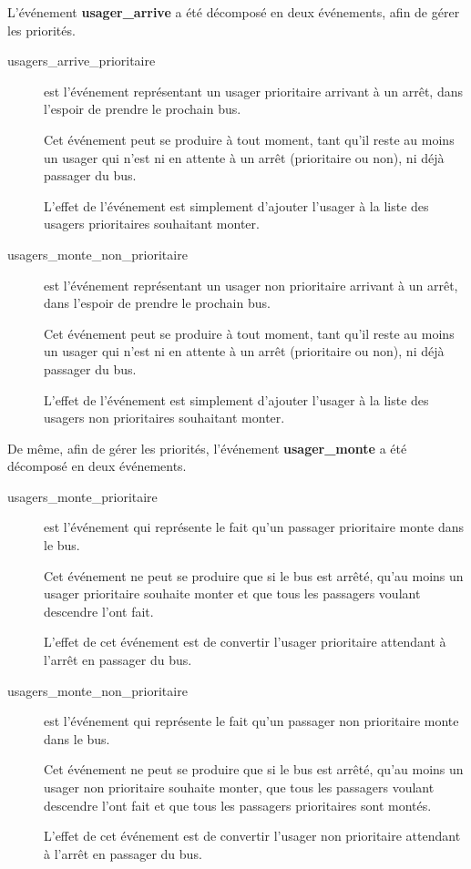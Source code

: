 ﻿\documentclass[a4paper,titlepage]{report}
\begin{document}
		L'événement \textbf{usager\_arrive} a été décomposé en deux événements, afin de gérer les priorités.
		\begin{description}
			\item[usagers\_arrive\_prioritaire] est l'événement représentant un usager prioritaire arrivant à un arrêt, dans l'espoir de prendre le prochain bus.
			
			Cet événement peut se produire à tout moment, tant qu'il reste au moins un usager qui n'est ni en attente à un arrêt (prioritaire ou non), ni déjà passager du bus.
			
			L'effet de l'événement est simplement d'ajouter l'usager à la liste des usagers prioritaires souhaitant monter.\\
			
			\item[usagers\_monte\_non\_prioritaire] est l'événement représentant un usager non prioritaire arrivant à un arrêt, dans l'espoir de prendre le prochain bus.
			
			Cet événement peut se produire à tout moment, tant qu'il reste au moins un usager qui n'est ni en attente à un arrêt (prioritaire ou non), ni déjà passager du bus.
			
			L'effet de l'événement est simplement d'ajouter l'usager à la liste des usagers non prioritaires souhaitant monter.\\
		\end{description}
		
		De même, afin de gérer les priorités, l'événement \textbf{usager\_monte} a été décomposé en deux événements.
		\begin{description}
			\item[usagers\_monte\_prioritaire] est l'événement qui représente le fait qu'un passager prioritaire monte dans le bus.
			
			Cet événement ne peut se produire que si le bus est arrêté, qu'au moins un usager prioritaire souhaite monter et que tous les passagers voulant descendre l'ont fait.
			
			L'effet de cet événement est de convertir l'usager prioritaire attendant à l'arrêt en passager du bus.\\
			
			\item[usagers\_monte\_non\_prioritaire] est l'événement qui représente le fait qu'un passager non prioritaire monte dans le bus.
			
			Cet événement ne peut se produire que si le bus est arrêté, qu'au moins un usager non prioritaire souhaite monter, que tous les passagers voulant descendre l'ont fait et que tous les passagers prioritaires sont montés.
			
			L'effet de cet événement est de convertir l'usager non prioritaire attendant à l'arrêt en passager du bus.\\
		\end{description}
			
\end{document}
